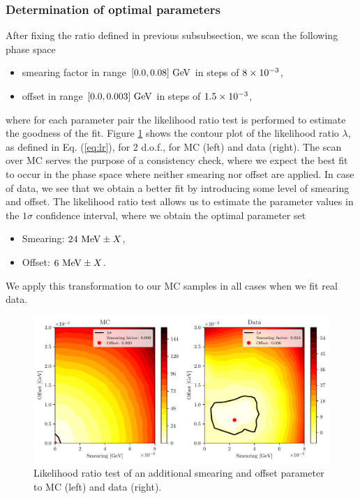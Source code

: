 \subsubsection{Determination of optimal parameters}

After fixing the ratio defined in previous subsubsection, we scan the following phase space
\begin{itemize}
\item smearing factor in range $[0.0,0.08]\mathrm{~GeV}$ in steps of $8\times 10^{-3}$,
\item offset in range $[0.0,0.003]\mathrm{~GeV}$ in steps of $1.5\times 10^{-3}$,
\end{itemize}
where for each parameter pair the likelihood ratio test is performed to estimate the goodness of the fit. Figure \ref{fig:smearing_offset} shows the contour plot of the likelihood ratio $\lambda$, as defined in Eq. (\ref{eq:lr}), for 2 d.o.f., for MC (left) and data (right). The scan over MC serves the purpose of a consistency check, where we expect the best fit to occur in the phase space where neither smearing nor offset are applied. In case of data, we see that we obtain a better fit by introducing some level of smearing and offset. The likelihood ratio test allows us to estimate the parameter values in the $1\sigma$ confidence interval, where we obtain the optimal parameter set
\begin{itemize}
\item Smearing: $24\mathrm{~MeV} \pm X$,
\item Offset: $6\mathrm{~MeV} \pm X$.
\end{itemize}
We apply this transformation to our MC samples in all cases when we fit real data.

\begin{figure}[H]
	\centering
	\captionsetup{width=0.8\linewidth}
	\includegraphics[width=\linewidth]{fig/smearing_offset}
	\caption{Likelihood ratio test of an additional smearing and offset parameter to MC (left) and data (right).}
	\label{fig:smearing_offset}
\end{figure}

